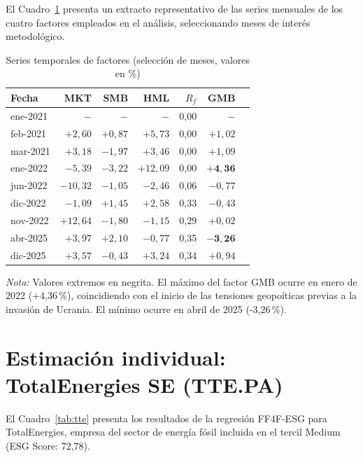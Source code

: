 \documentclass[12pt, a4paper]{article}
\begin{document}
El Cuadro~\ref{tab:series} presenta un extracto representativo de las series mensuales
de los cuatro factores empleados en el an\'alisis, seleccionando meses de inter\'es
metodol\'ogico.

\begin{table}[H]
  \centering
  \caption{Series temporales de factores (selecci\'on de meses, valores en \%)}
  \label{tab:series}
  \small
  \begin{tabular}{lrrrrrr}
    \toprule
    Fecha & MKT & SMB & HML & $R_f$ & GMB \\
    \midrule
    ene-2021 & $-$     & $-$     & $-$     & 0{,}00 & $-$ \\
    feb-2021 & $+2{,}60$ & $+0{,}87$ & $+5{,}73$ & 0{,}00 & $+1{,}02$ \\
    mar-2021 & $+3{,}18$ & $-1{,}97$ & $+3{,}46$ & 0{,}00 & $+1{,}09$ \\
    ene-2022 & $-5{,}39$ & $-3{,}22$ & $+12{,}09$ & 0{,}00 & $\mathbf{+4{,}36}$ \\
    jun-2022 & $-10{,}32$ & $-1{,}05$ & $-2{,}46$ & 0{,}06 & $-0{,}77$ \\
    dic-2022 & $-1{,}09$ & $+1{,}45$ & $+2{,}58$ & 0{,}33 & $-0{,}43$ \\
    nov-2022 & $+12{,}64$ & $-1{,}80$ & $-1{,}15$ & 0{,}29 & $+0{,}02$ \\
    abr-2025 & $+3{,}97$ & $+2{,}10$ & $-0{,}77$ & 0{,}35 & $\mathbf{-3{,}26}$ \\
    dic-2025 & $+3{,}57$ & $-0{,}43$ & $+3{,}24$ & 0{,}34 & $+0{,}94$ \\
    \bottomrule
  \end{tabular}
  \begin{minipage}{\linewidth}
    \small\vspace{0.3em}
    \textit{Nota:} Valores extremos en negrita. El m\'aximo del factor GMB ocurre en
    enero de 2022 (+4,36\,\%), coincidiendo con el inicio de las tensiones geopo\'iticas
    previas a la invasi\'on de Ucrania. El m\'inimo ocurre en abril de 2025 (-3,26\,\%).
  \end{minipage}
\end{table}

\section{Estimaci\'on individual: TotalEnergies SE (TTE.PA)}
\label{app:totalenergies}

El Cuadro~\ref{tab:tte} presenta los resultados de la regresi\'on FF4F-ESG para
TotalEnergies, empresa del sector de energ\'ia f\'osil incluida en el tercil Medium
(ESG Score: 72,78).
\end{document}
